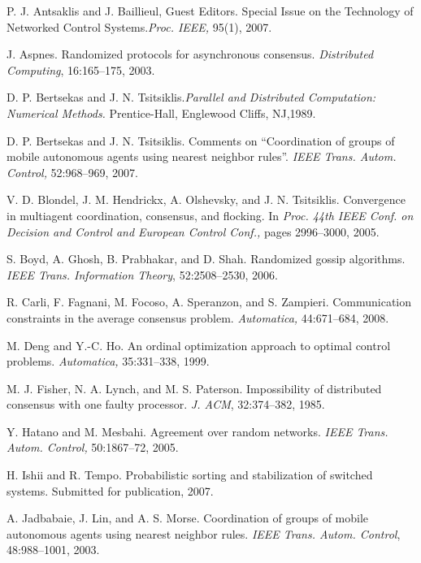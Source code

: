 \documentclass[12pt]{article} %
\begin{document}
	\begin{thebibliography}{30}
		 P. J. Antsaklis and J. Baillieul, Guest Editors. Special Issue on the Technology of Networked Control Systems.\textit{Proc. IEEE,} 95(1), 2007.
		
		
		 J. Aspnes. Randomized protocols for asynchronous consensus. \textit{Distributed Computing}, 16:165–175, 2003.
		
		
		 D. P. Bertsekas and J. N. Tsitsiklis.\textit{Parallel and Distributed Computation: Numerical Methods.} Prentice-Hall, Englewood Cliffs, NJ,1989.
		
		
		 D. P. Bertsekas and J. N. Tsitsiklis. Comments on “Coordination of groups of mobile autonomous agents using nearest neighbor rules”. \textit{IEEE Trans. Autom. Control,} 52:968–969, 2007.
		
		
		 V. D. Blondel, J. M. Hendrickx, A. Olshevsky, and J. N. Tsitsiklis. Convergence in multiagent coordination, consensus, and flocking. In \textit{Proc. 44th IEEE Conf. on Decision and Control and European Control Conf.,} pages 2996–3000, 2005.
		
		
		 S. Boyd, A. Ghosh, B. Prabhakar, and D. Shah. Randomized gossip algorithms. \textit{IEEE Trans. Information Theory}, 52:2508–2530, 2006.
		
		
		 R. Carli, F. Fagnani, M. Focoso, A. Speranzon, and S. Zampieri. Communication constraints in the average consensus problem. \textit{Automatica,} 44:671–684, 2008.
		
		
		 M. Deng and Y.-C. Ho. An ordinal optimization approach to optimal control problems. \textit{ Automatica,} 35:331–338, 1999.
		
		
		 M. J. Fisher, N. A. Lynch, and M. S. Paterson. Impossibility of distributed consensus with one faulty processor. \textit{J. ACM}, 32:374–382, 1985.
		
		
		 Y. Hatano and M. Mesbahi. Agreement over random networks. \textit{IEEE Trans. Autom. Control,} 50:1867–72, 2005.
		
		
		 H. Ishii and R. Tempo. Probabilistic sorting and stabilization of switched systems. Submitted for publication, 2007.
		
		
		 A. Jadbabaie, J. Lin, and A. S. Morse. Coordination of groups of mobile autonomous agents using nearest neighbor rules. \textit{IEEE Trans. Autom. Control}, 48:988–1001, 2003.
		

\end{thebibliography}
\end{document}
